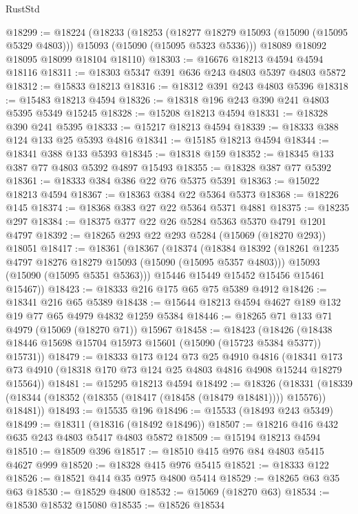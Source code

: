 \begin{lexlean}{RustStd}
\begin{coremodule}
@18299 := @18224
    (@18233
      (@18253
        (@18277 @18279 @15093 (@15090 (@15095 @5329 @4803)))
        @15093
        (@15090 (@15095 @5323 @5336)))
      @18089
      @18092
      @18095
      @18099
      @18104
      @18110)
@18303 := @16676 @18213 @4594 @4594 @18116
@18311 := @18303 @5347 @391 @636 @243 @4803 @5397 @4803 @5872
@18312 := @15833 @18213
@18316 := @18312 @391 @243 @4803 @5396
@18318 := @15483 @18213 @4594
@18326 := @18318 @196 @243 @390 @241 @4803 @5395 @5349 @15245
@18328 := @15208 @18213 @4594
@18331 := @18328 @390 @241 @5395
@18333 := @15217 @18213 @4594
@18339 := @18333 @388 @124 @133 @25 @5393 @4816
@18341 := @15185 @18213 @4594
@18344 := @18341 @388 @133 @5393
@18345 := @18318 @159
@18352 := @18345 @133 @387 @77 @4803 @5392 @4897 @15493
@18355 := @18328 @387 @77 @5392
@18361 := @18333 @384 @386 @22 @76 @5375 @5391
@18363 := @15022 @18213 @4594
@18367 := @18363 @384 @22 @5364 @5373
@18368 := @18226 @145
@18374 := @18368 @383 @27 @22 @5364 @5371 @4881
@18375 := @18235 @297
@18384 := @18375 @377 @22 @26 @5284 @5363 @5370 @4791 @1201 @4797
@18392 := @18265 @293 @22 @293 @5284 (@15069 (@18270 @293)) @18051
@18417 := @18361
    (@18367
      (@18374
        (@18384
          @18392
          (@18261 @1235 @4797 @18276 @18279 @15093 (@15090 (@15095 @5357 @4803)))
          @15093
          (@15090 (@15095 @5351 @5363)))
        @15446
        @15449
        @15452
        @15456
        @15461
        @15467))
@18423 := @18333 @216 @175 @65 @75 @5389 @4912
@18426 := @18341 @216 @65 @5389
@18438 := @15644 @18213 @4594 @4627 @189 @132 @19 @77 @65 @4979 @4832 @1259 @5384
@18446 := @18265 @71 @133 @71 @4979 (@15069 (@18270 @71)) @15967
@18458 := @18423
    (@18426 (@18438 @18446 @15698 @15704 @15973 @15601 (@15090 (@15723 @5384 @5377)) @15731))
@18479 := @18333
    @173
    @124
    @73
    @25
    @4910
    @4816
    (@18341 @173 @73 @4910 (@18318 @170 @73 @124 @25 @4803 @4816 @4908 @15244 @18279 @15564))
@18481 := @15295 @18213 @4594
@18492 := @18326
    (@18331 (@18339 (@18344 (@18352 (@18355 (@18417 (@18458 (@18479 @18481)))) @15576)) @18481))
@18493 := @15535 @196
@18496 := @15533 (@18493 @243 @5349)
@18499 := @18311 (@18316 (@18492 @18496))
@18507 := @18216 @416 @432 @635 @243 @4803 @5417 @4803 @5872
@18509 := @15194 @18213 @4594
@18510 := @18509 @396
@18517 := @18510 @415 @976 @84 @4803 @5415 @4627 @999
@18520 := @18328 @415 @976 @5415
@18521 := @18333 @122
@18526 := @18521 @414 @35 @975 @4800 @5414
@18529 := @18265 @63 @35 @63
@18530 := @18529 @4800
@18532 := @15069 (@18270 @63)
@18534 := @18530 @18532 @15080
@18535 := @18526 @18534

\end{coremodule}
\end{lexlean}
